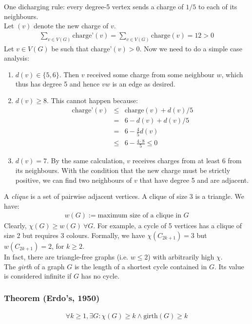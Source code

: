 \documentclass[11pt]{book}
\begin{document}
		One dicharging rule: every degree-5 vertex sends  a charge of $1/5$ to each of its neighbours.\\
		
		Let $(v)$ denote the new charge of $v$. 
		\begin{eqnarray}
			\sum_{v \in V(G)} \text{charge'}(v) = \sum_{v \in V(G)} \text{charge}(v) = 12 > 0
		\end{eqnarray}
		Let $v \in V(G)$ be such that charge'$(v) > 0$. Now we need to do a simple case analysis:
		\begin{enumerate}
			\item $d(v) \in \{ 5,  6 \}$. Then $v$ received some charge from some neighbour $w$, which thus has degree 5 and hence $vw$ is an edge as desired.
			\item $d(v) \geq 8$. This cannot happen because:
				\begin{eqnarray}
					\text{charge'}(v) &\leq&  \text{charge}(v) + d(v)/5\\
					&=& 6 - d(v) + d(v)/5\\
					&=& 6 - \frac{4}{5}d(v)\\
					&\leq& 6 - \frac{4 \cdot 8}{5} \leq 0 
				\end{eqnarray}   
			\item $d(v) = 7$. By the same calculation, $v$ receives charges from at least 6 from its neighbours. With the condition that the new charge must be strictly positive, we can find two neighbours of $v$ that have degree 5 and are adjacent.
		\end{enumerate}
		
	A \textit{clique} is a set of pairwise adjacent vertices. A clique of size 3 is a triangle. We have:
	\begin{eqnarray}
		w(G)  := \text{maximum size of a clique in }G
	\end{eqnarray}
	Clearly, $\chi(G) \geq w(G) ~\forall G$. For example, a cycle of 5 vertices has a clique of size 2 but requires 3 colours. Formally, we have $\chi(C_{2k + 1}) = 3$ but $w(C_{2k + 1}) = 2$, for $k \geq 2$.\\
	
	In fact, there are triangle-free graphs (i.e. $w \leq 2$) with arbitrarily high $\chi$.\\
	
	The \textit{girth} of a graph $G$ is the length of a shortest cycle contained in $G$. Its value is considered infinite if $G$ has no cycle.
	
		\subsubsection{Theorem (Erdo's, 1950)}
		\begin{eqnarray}
			\forall k \geq 1, \exists G : \chi(G) \geq k \wedge \text{girth}(G) \geq k
		\end{eqnarray}
		
\end{document}
